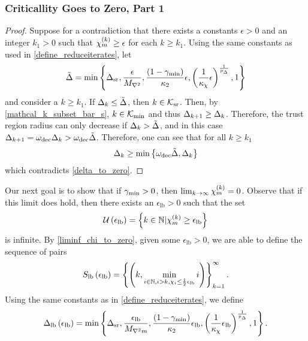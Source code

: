 \subsubsection{Criticallity Goes to Zero, Part 1}


 

\begin{proof}
Suppose for a contradiction that there exists a constants $\epsilon > 0$ and an integer $k_1 > 0$ such that ${\chi_m^{(k)}} \ge \epsilon$ for each $k \ge k_1$.
Using the same constants as used in \cref{define_reduceiterates}, let
\begin{align*}
\tilde \Delta = \min \left\{
{\Delta_{\textrm{sr}}}, 
\frac{\epsilon}{{M_{\nabla^2}}}, 
\frac{(1 - \gamma_{\textrm{min}})}{{\kappa_2}} \epsilon,
\left(\frac 1 {\kappa_{\chi}} \epsilon \right)^{\frac 1 {p_{\Delta}}},
1\right\}
\end{align*}
and consider a $k \ge k_1$.
If $\Delta_k \le \tilde \Delta$, then $k \in {\mathcal K_{\textrm{sr}}}$.
Then, by \cref{mathcal_k_subset_bar_s},  $k \in {\mathcal K_{\textrm{min}}}$ and thus $\Delta_{k+1} \ge \Delta_k$.
Therefore, the trust region radius can only decrease if $\Delta_k > \tilde \Delta$, and in this case $\Delta_{k+1} = \omega_{\text{dec}}\Delta_k > \omega_{\text{dec}} \tilde \Delta$.
Therefore, one can see that for all $k \ge k_1$
\begin{align}
\Delta_k \ge \min\left\{\omega_{\text{dec}} \tilde \Delta, \Delta_k \right\}
\end{align}
which contradicts \cref{delta_to_zero}.
\end{proof}

Our next goal is to show that if $\gamma_{\textrm{min}} > 0$, then $\lim_{k\to\infty} {\chi_m^{(k)}} = 0$.
Observe that if this limit does hold, then there exists an $\epsilon_{\textrm{lb}} > 0$ such that the set
\begin{align}
{\mathcal U\left(\epsilon_{\textrm{lb}}\right)} = \left\{k \in \mathbb N | {\chi_m^{(k)}} \ge{\epsilon_{\textrm{lb}}} \right\} \label{define_the_finite_set}
\end{align}
is infinite.
By \cref{liminf_chi_to_zero}, given some $\epsilon_{\textrm{lb}} > 0$, we are able to define the sequence of pairs
\begin{align}
\label{define_slb}
{S_{\textrm{lb}}\left(\epsilon_{\textrm{lb}}\right)} = \left\{\left(k,
\min_{i \in \mathbb N, i > k, \chi_{i} \le \frac 1 2 {\epsilon_{\textrm{lb}}}} i
\right)\right\}_{k=1}^{\infty}.
\end{align}
Using the same constants as in \cref{define_reduceiterates}, we define
\begin{align}
{\Delta_{\textrm{lb}}\left(\epsilon_{\textrm{lb}}\right)} = \min\left\{
{\Delta_{\textrm{sr}}},
\frac{{\epsilon_{\textrm{lb}}}}{{M_{\nabla^2 m}}}, 
\frac{(1-\gamma_{\textrm{min}})}{{\kappa_2}}{\epsilon_{\textrm{lb}}}, 
\left(\frac 1 {\kappa_{\chi}} {\epsilon_{\textrm{lb}}} \right)^{\frac 1 {p_{\Delta}}}, 
1
\right\}. \label{define_delta_lb}
\end{align}


